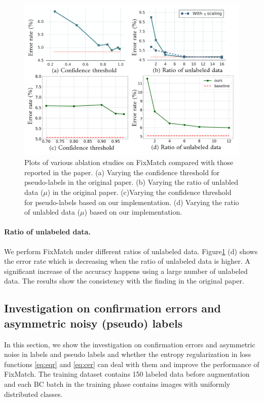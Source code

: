 \begin{figure}[h]
\centering
\includegraphics[width=14cm]{fig/FixMatch.png}
\caption{Plots of various ablation studies on FixMatch compared with those reported in the paper. (a) Varying the confidence threshold for pseudo-labels in the original paper. (b) Varying the ratio of unlabled data ($\mu$) in the original paper. (c)Varying the confidence threshold for pseudo-labels based on our implementation. (d) Varying the ratio of unlabled data ($\mu$) based on our implementation.
}\label{fig:abastudy}
\end{figure}



\paragraph{Ratio of unlabeled data.}

We perform FixMatch under different ratios of unlabeled data. Figure\ref{fig:abastudy} (d) shows the error rate which is decreasing when the ratio of unlabeled data is higher. A significant increase of the accuracy happens using a large number of unlabeled data. The results show the consistency with the finding in the original paper.



\subsection{Investigation on confirmation errors and asymmetric noisy (pseudo) labels} \label{sec:exp_noise}
In this section, we show the investigation on confirmation errors and asymmetric noise in labels and pseudo labels and whether the entropy regularization in loss functions \eqref{eq:eqr} and \eqref{eq:cer} can deal with them and improve the performance of FixMatch. The training dataset contains 150 labeled data before augmentation and each BC batch in the training phase contains images with uniformly distributed classes.

